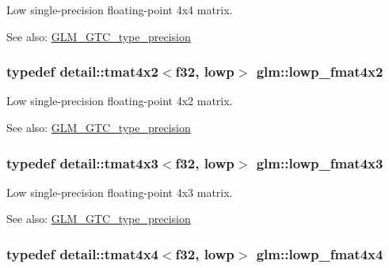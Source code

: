 Low single-precision floating-point 4x4 matrix. \begin{Desc}
\item[See also:]\hyperlink{group__gtc__type__precision}{GLM\_\-GTC\_\-type\_\-precision} \end{Desc}
\hypertarget{group__gtc__type__precision_g2433f92674e42eb6a75384fbab262306}{
\subsubsection[lowp\_\-fmat4x2]{\setlength{\rightskip}{0pt plus 5cm}typedef detail::tmat4x2$<$f32, lowp$>$ {\bf glm::lowp\_\-fmat4x2}}}
\label{group__gtc__type__precision_g2433f92674e42eb6a75384fbab262306}


Low single-precision floating-point 4x2 matrix. \begin{Desc}
\item[See also:]\hyperlink{group__gtc__type__precision}{GLM\_\-GTC\_\-type\_\-precision} \end{Desc}
\hypertarget{group__gtc__type__precision_ga4df4f3adcc8eb3bed680b14a87fb2c4}{
\subsubsection[lowp\_\-fmat4x3]{\setlength{\rightskip}{0pt plus 5cm}typedef detail::tmat4x3$<$f32, lowp$>$ {\bf glm::lowp\_\-fmat4x3}}}
\label{group__gtc__type__precision_ga4df4f3adcc8eb3bed680b14a87fb2c4}


Low single-precision floating-point 4x3 matrix. \begin{Desc}
\item[See also:]\hyperlink{group__gtc__type__precision}{GLM\_\-GTC\_\-type\_\-precision} \end{Desc}
\hypertarget{group__gtc__type__precision_g9ff955b170643f547661d2e7263ee426}{
\subsubsection[lowp\_\-fmat4x4]{\setlength{\rightskip}{0pt plus 5cm}typedef detail::tmat4x4$<$f32, lowp$>$ {\bf glm::lowp\_\-fmat4x4}}}
\label{group__gtc__type__precision_g9ff955b170643f547661d2e7263ee426}


